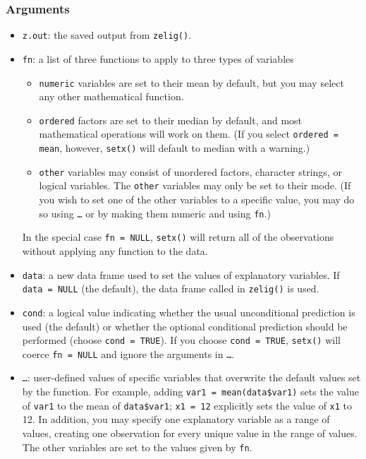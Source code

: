 \subsubsection{Arguments}
\begin{itemize}
  
\item {\tt z.out}: the saved output from \texttt{zelig()}.
  
\item {\tt fn}: a list of three functions to apply to three types of
  variables
  \begin{itemize}
  \item {\tt numeric} variables are set to their mean by default, but
    you may select any other mathematical function.
  \item {\tt ordered} factors are set to their median by default, and
    most mathematical operations will work on them.  (If you select
    {\tt ordered = mean}, however, {\tt setx()} will default to median
    with a warning.)
  \item {\tt other} variables may consist of unordered factors,
    character strings, or logical variables.  The {\tt other}
    variables may only be set to their mode.  (If you wish to set one
    of the other variables to a specific value, you may do so using
    {\tt \dots} or by making them numeric and using \texttt{fn}.)
  \end{itemize}
  In the special case {\tt fn = NULL}, {\tt setx()} will return all of
  the observations without applying any function to the data.
\item {\tt data}: a new data frame used to set the values of
  explanatory variables. If {\tt data = NULL} (the default), the data
  frame called in \texttt{zelig()} is used.
\item {\tt cond}: a logical value indicating whether the usual
  unconditional prediction is used (the default) or whether the optional
  conditional prediction should be performed (choose {\tt cond =
    TRUE}).  If you choose {\tt cond = TRUE}, {\tt setx()} will coerce
  {\tt fn = NULL} and ignore the arguments in {\tt \dots}.
\item {\tt \dots}: user-defined values of specific variables that
  overwrite the default values set by the function.  For example,
  adding {\tt var1 = mean(data\$var1)} sets the value of \texttt{var1}
  to the mean of {\tt data\$var1}; {\tt x1 = 12} explicitly sets the value
  of {\tt x1} to 12.  In addition, you may specify one explanatory
  variable as a range of values, creating one observation for every
  unique value in the range of values.  The other variables are set to
  the values given by {\tt fn}.
\end{itemize}

